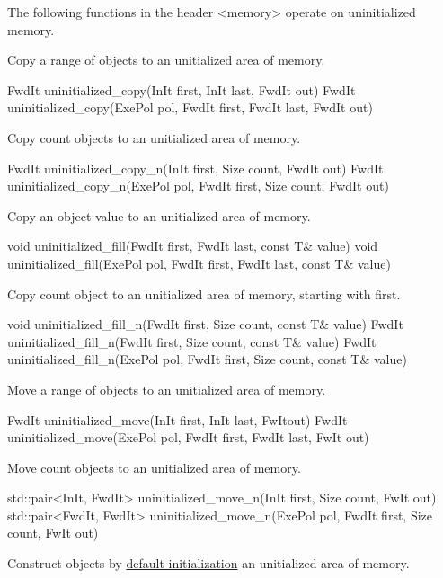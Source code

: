 The following functions in the header <memory> operate on uninitialized memory.

Copy a range of objects to an unitialized area of memory.

\begin{cpp}
FwdIt uninitialized_copy(InIt first, InIt last, FwdIt out)
FwdIt uninitialized_copy(ExePol pol, FwdIt first, FwdIt last, FwdIt out)
\end{cpp}

Copy count objects to an unitialized area of memory.

\begin{cpp}
FwdIt uninitialized_copy_n(InIt first, Size count, FwdIt out)
FwdIt uninitialized_copy_n(ExePol pol, FwdIt first, Size count, FwdIt out)
\end{cpp}

Copy an object value to an unitialized area of memory.

\begin{cpp}
void uninitialized_fill(FwdIt first, FwdIt last, const T& value)
void uninitialized_fill(ExePol pol, FwdIt first, FwdIt last, const T& value)
\end{cpp}

Copy count object to an unitialized area of memory, starting with first.

\begin{cpp}
void uninitialized_fill_n(FwdIt first, Size count, const T& value)
FwdIt uninitialized_fill_n(FwdIt first, Size count, const T& value)
FwdIt uninitialized_fill_n(ExePol pol, FwdIt first, Size count, const T& value)
\end{cpp}

Move a range of objects to an unitialized area of memory.

\begin{cpp}
FwdIt uninitialized_move(InIt first, InIt last, FwItout)
FwdIt uninitialized_move(ExePol pol, FwdIt first, FwdIt last, FwIt out)
\end{cpp}

Move count objects to an unitialized area of memory.

\begin{cpp}
std::pair<InIt, FwdIt> uninitialized_move_n(InIt first, Size count, FwIt out)
std::pair<FwdIt, FwdIt> uninitialized_move_n(ExePol pol, FwdIt first, Size count,
											 FwIt out)
\end{cpp}

Construct objects by \href{https://en.cppreference.com/w/cpp/language/default_initialization}{default initialization} an unitialized area of memory.

